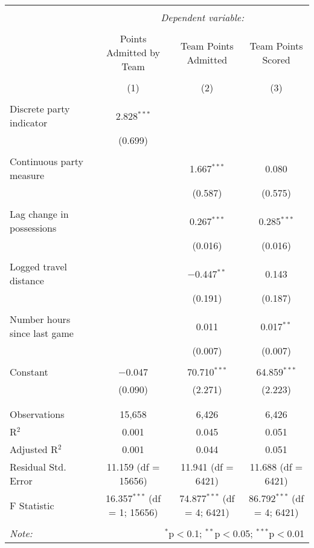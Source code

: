 \documentclass[letterpaper,12pt]{article}
\begin{document}
\hspace{-100pt}
\begin{tabular}{@{\extracolsep{5pt}}lccc}  \\[-1.8ex]\hline  \hline \\[-1.8ex]   & \multicolumn{3}{c}{\textit{Dependent variable:}} \\  \cline{2-4}  \\[-1.8ex] & Points Admitted by Team & Team Points Admitted & Team Points Scored \\  \\[-1.8ex] & (1) & (2) & (3)\\  \hline \\[-1.8ex]   Discrete party indicator & 2.828$^{***}$ &  &  \\    & (0.699) &  &  \\    & & & \\   Continuous party measure &  & 1.667$^{***}$ & 0.080 \\    &  & (0.587) & (0.575) \\    & & & \\   Lag change in possessions &  & 0.267$^{***}$ & 0.285$^{***}$ \\    &  & (0.016) & (0.016) \\    & & & \\   Logged travel distance &  & $-$0.447$^{**}$ & 0.143 \\    &  & (0.191) & (0.187) \\    & & & \\   Number hours since last game &  & 0.011 & 0.017$^{**}$ \\    &  & (0.007) & (0.007) \\    & & & \\   Constant & $-$0.047 & 70.710$^{***}$ & 64.859$^{***}$ \\    & (0.090) & (2.271) & (2.223) \\    & & & \\  \hline \\[-1.8ex]  Observations & 15,658 & 6,426 & 6,426 \\  R$^{2}$ & 0.001 & 0.045 & 0.051 \\  Adjusted R$^{2}$ & 0.001 & 0.044 & 0.051 \\  Residual Std. Error & 11.159 (df = 15656) & 11.941 (df = 6421) & 11.688 (df = 6421) \\  F Statistic & 16.357$^{***}$ (df = 1; 15656) & 74.877$^{***}$ (df = 4; 6421) & 86.792$^{***}$ (df = 4; 6421) \\  \hline  \hline \\[-1.8ex]  \textit{Note:}  & \multicolumn{3}{r}{$^{*}$p$<$0.1; $^{**}$p$<$0.05; $^{***}$p$<$0.01} \\  \end{tabular}  
\end{document}
